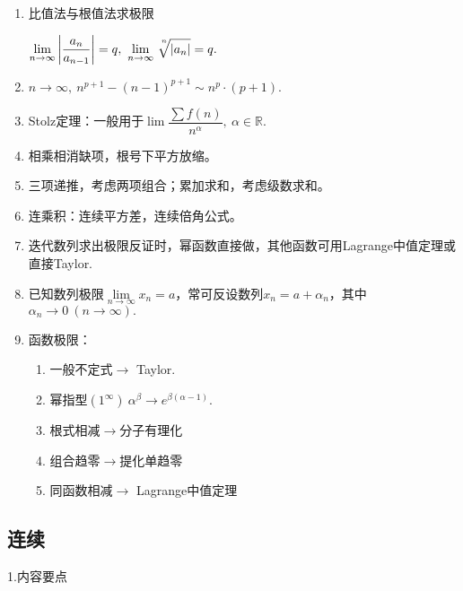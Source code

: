 \documentclass[UTF8]{ctexart}
\numberwithin{equation}{section}
\numberwithin{figure}{section}
\numberwithin{table}{section}
\newcommand\no{\noindent}
\newcommand\dis{\displaystyle}
\newcommand\limn{\dis\lim\limits_{n\to\infty}}
\begin{document}
\begin{spacing}{2}
\begin{enumerate}[itemindent=1.4em, label=(\arabic*)]
\item 比值法与根值法求极限

\setlength\parindent{2em}$\limn \left|\dfrac{a_n}{a_{n-1}}\right|=q,\ 
\limn\sqrt[\leftroot{-3}\uproot{+7}n]{|a_n|}=q.$

\item $n\to\infty,\ n^{p+1}-(n-1)^{p+1}\sim n^p\cdot (p+1).$

\item Stolz定理：一般用于$\lim\dfrac{\sum f(n)}{n^\alpha},\ \alpha\in\mathbb{R}$.

\item 相乘相消缺项，根号下平方放缩。

\item 三项递推，考虑两项组合；累加求和，考虑级数求和。

\item 连乘积：连续平方差，连续倍角公式。

\item 迭代数列求出极限反证时，幂函数直接做，其他函数可用Lagrange中值定理或直接Taylor.

\item 已知数列极限$\limn x_n=a$，常可反设数列$x_n=a+\alpha_n$，其中$\alpha_n\to0\ (n\to\infty).$

\item 函数极限：

\begin{enumerate}[itemindent=1.4em, label=(\alph*)]

\item 一般不定式$\longrightarrow$ Taylor.

\item 幂指型$(1^\infty)\ \alpha^\beta\longrightarrow e^{\beta(\alpha-1)}.$

\item 根式相减$\longrightarrow$分子有理化

\item 组合趋零$\longrightarrow$提化单趋零

\item 同函数相减$\longrightarrow$ Lagrange中值定理

\end{enumerate}

\end{enumerate}

\subsection{连续}

\no1.内容要点


\end{spacing}
\end{document}
